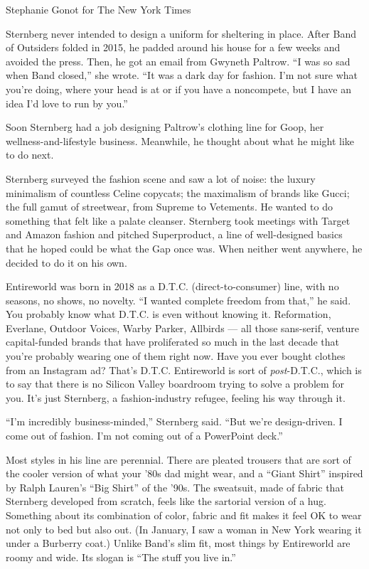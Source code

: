 Stephanie Gonot for The New York Times

Sternberg never intended to design a uniform for sheltering in place.
After Band of Outsiders folded in 2015, he padded around his house for a
few weeks and avoided the press. Then, he got an email from Gwyneth
Paltrow. ``I was so sad when Band closed,'' she wrote. ``It was a dark
day for fashion. I'm not sure what you're doing, where your head is at
or if you have a noncompete, but I have an idea I'd love to run by
you.''

Soon Sternberg had a job designing Paltrow's clothing line for Goop, her
wellness-and-lifestyle business. Meanwhile, he thought about what he
might like to do next.

Sternberg surveyed the fashion scene and saw a lot of noise: the luxury
minimalism of countless Celine copycats; the maximalism of brands like
Gucci; the full gamut of streetwear, from Supreme to Vetements. He
wanted to do something that felt like a palate cleanser. Sternberg took
meetings with Target and Amazon fashion and pitched Superproduct, a line
of well-designed basics that he hoped could be what the Gap once was.
When neither went anywhere, he decided to do it on his own.

Entireworld was born in 2018 as a D.T.C. (direct-to-consumer) line, with
no seasons, no shows, no novelty. ``I wanted complete freedom from
that,'' he said. You probably know what D.T.C. is even without knowing
it. Reformation, Everlane, Outdoor Voices, Warby Parker, Allbirds ---
all those sans-serif, venture capital-funded brands that have
proliferated so much in the last decade that you're probably wearing one
of them right now. Have you ever bought clothes from an Instagram ad?
That's D.T.C. Entireworld is sort of \emph{post}-D.T.C., which is to say
that there is no Silicon Valley boardroom trying to solve a problem for
you. It's just Sternberg, a fashion-industry refugee, feeling his way
through it.

``I'm incredibly business-minded,'' Sternberg said. ``But we're
design-driven. I come out of fashion. I'm not coming out of a PowerPoint
deck.''

Most styles in his line are perennial. There are pleated trousers that
are sort of the cooler version of what your '80s dad might wear, and a
``Giant Shirt'' inspired by Ralph Lauren's ``Big Shirt'' of the '90s.
The sweatsuit, made of fabric that Sternberg developed from scratch,
feels like the sartorial version of a hug. Something about its
combination of color, fabric and fit makes it feel OK to wear not only
to bed but also out. (In January, I saw a woman in New York wearing it
under a Burberry coat.) Unlike Band's slim fit, most things by
Entireworld are roomy and wide. Its slogan is ``The stuff you live in.''

